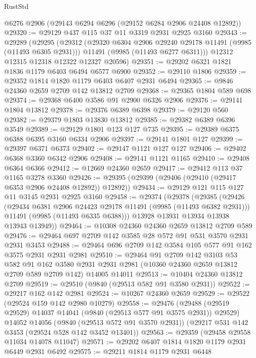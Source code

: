 \begin{lexlean}{RustStd}
\begin{coremodule}
    @6276
    @2906
    (@29143 @6294 @6296 (@29152 @6284 @2906 @24408 @12892))
@29320 := @29129 @437 @115 @37 @11 @3319 @2931 @2925 @3160
@29343 := @29289
    (@29295
      (@29312
        (@29320 @6304 @2906 @29240 @29178 @11491 (@9985 (@11493 @6305 @2931)))
        @11491
        (@9985 (@11493 @6277 @6311)))
      @12312
      @12315
      @12318
      @12322
      @12327
      @20596)
@29351 := @29202 @6321 @1821 @1836 @1179 @6403 @6494 @6577 @6900
@29352 := @29110 @1806
@29359 := @29352 @1814 @1820 @1179 @6403 @6407 @2931 @6494
@29365 := @9846 @24360 @2659 @2709 @142 @13812 @2709
@29368 := @29365 @1804 @589 @698
@29374 := @29368 @6400 @3586 @91 @2900 @6326 @2906
@29376 := @29141 @1804 @13812
@29378 := @29376 @6389 @6398
@29379 := @29120 @560
@29382 := @29379 @1803 @13830 @13812
@29385 := @29382 @6389 @6396 @3549
@29389 := @29129 @1801 @123 @127 @735
@29395 := @29389 @6375 @6388 @6395 @3160 @6334 @2906
@29397 := @29141 @1801 @127
@29399 := @29397 @6371 @6373
@29402 := @29147 @1121 @127 @127
@29406 := @29402 @6368 @3360 @6342 @2906
@29408 := @29141 @1121 @1165
@29410 := @29408 @6364 @6366
@29412 := @12669 @24360 @2659
@29417 := @29412 @113 @37 @1165 @3278 @3360
@29426 := @29395 (@29399 (@29406 (@29410 (@29417 @6353 @2906 @24408 @12892)) @12892))
@29434 := @29129 @121 @115 @127 @11 @3145 @2931 @2925 @3160
@29458 := @29374
    (@29378
      (@29385
        (@29426
          (@29434 @6381 @2906 @24423 @29178 @11491 (@9985 (@11493 @6382 @2931)))
          @11491
          (@9985 (@11493 @6335 @6388)))
        @13928
        @13931
        @13934
        @13938
        @13943
        @13949))
@29464 := @10308 @24360 @24360 @2659 @13812 @2709 @589
@29476 := @29464 @697 @2709 @142 @3585 @28 @572 @91 @531 @3570 @2931 @2931 @3453
@29488 := @29464 @696 @2709 @142 @3584 @105 @577 @91 @162 @3575 @2931 @2931 @2981
@29510 := @29464
    @91
    @2709
    @142
    @3103
    @53
    @582
    @91
    @162
    @3580
    @2931
    @2931
    @2981
    (@10360 @24360 @2659 @13812 @2709 @589 @2709 @142)
    @14005
    @14011
@29513 := @10404 @24360 @13812 @2709
@29519 := @29510 (@9840 (@29513 @582 @91 @3580 @2931))
@29522 := @29217 @162 @142 @2981
@29524 := @10267 @24360 @2659
@29529 := @29522 (@29524 @159 @142 @2980 @10279)
@29558 := @29476
    (@29488 (@29519 @29529) @14037 @14041 (@9840 (@29513 @577 @91 @3575 @2931)) @29529)
    @14052
    @14056
    (@9840 (@29513 @572 @91 @3570 @2931))
    (@29217 @531 @142 @3453 (@29524 @528 @142 @3452 @13401))
@29563 := @29359 (@29458 @29558 @11034 @14078 @11047)
@29571 := @29202 @6407 @1814 @1820 @1179 @2931 @6449 @2931 @6492
@29575 := @29211 @1814 @1179 @2931 @6448

\end{coremodule}
\end{lexlean}
